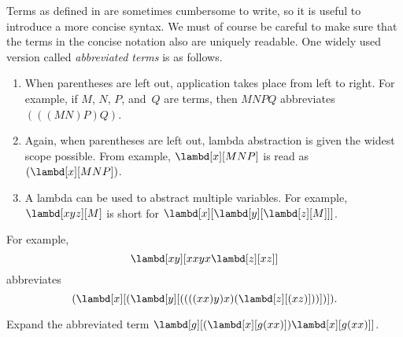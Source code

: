 \documentclass[../../../include/open-logic-section]{subfiles}
\begin{document}

Terms as defined in  are sometimes cumbersome to
write, so it is useful to introduce a more concise syntax. We must of
course be careful to make sure that the terms in the concise notation
also are uniquely readable.  One widely used version called
\emph{abbreviated terms} is as follows.

\begin{enumerate}
\item When parentheses are left out, application takes place from left
  to right. For example, if $M$, $N$, $P$, and~$Q$ are terms, then
  $MNPQ$ abbreviates $(((MN)P)Q)$.
\item Again, when parentheses are left out, lambda abstraction is
  given the widest scope possible. From example, $\lambd[x][MNP]$ is
  read as $(\lambd[x][MNP])$.
\item A lambda can be used to abstract multiple variables. For
  example, $\lambd[xyz][M]$ is short for
  $\lambd[x][\lambd[y][\lambd[z][M]]]$.
\end{enumerate}

For example,
\[
\lambd[xy][xxyx \lambd[z][xz]]
\]
abbreviates
\[
(\lambd[x][(\lambd[y][((((xx)y)x)(\lambd[z][(xz)]))])]).
\]

\begin{prob}
Expand the abbreviated term $\lambd[g][(\lambd[x][g (x x)])
  \lambd[x][g (x x)]]$.
\end{prob}
\end{document}
